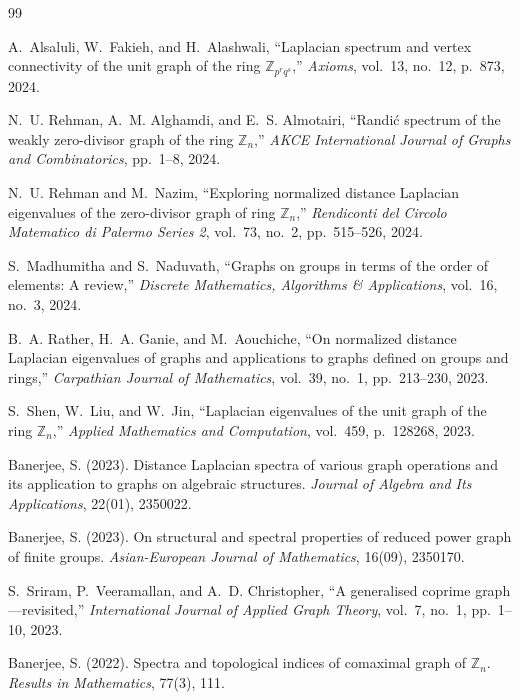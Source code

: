 \documentclass[12pt]{article}
\begin{document}
	\begin{thebibliography}{99}
		
		A.~Alsaluli, W.~Fakieh, and H.~Alashwali, ``Laplacian spectrum and vertex connectivity of the unit graph of the ring $\mathbb{Z}_{p^rq^s}$,'' \emph{Axioms}, vol.~13, no.~12, p.~873, 2024.
		
		N.~U. Rehman, A.~M. Alghamdi, and E.~S. Almotairi, ``Randić spectrum of the weakly zero-divisor graph of the ring $\mathbb{Z}_n$,'' \emph{AKCE International Journal of Graphs and Combinatorics}, pp.~1--8, 2024.
		
		N.~U. Rehman and M.~Nazim, ``Exploring normalized distance Laplacian eigenvalues of the zero-divisor graph of ring $\mathbb{Z}_n$,'' \emph{Rendiconti del Circolo Matematico di Palermo Series 2}, vol.~73, no.~2, pp.~515--526, 2024.
		
		S.~Madhumitha and S.~Naduvath, ``Graphs on groups in terms of the order of elements: A review,'' \emph{Discrete Mathematics, Algorithms \& Applications}, vol.~16, no.~3, 2024.
		
		B.~A. Rather, H.~A. Ganie, and M.~Aouchiche, ``On normalized distance Laplacian eigenvalues of graphs and applications to graphs defined on groups and rings,'' \emph{Carpathian Journal of Mathematics}, vol.~39, no.~1, pp.~213--230, 2023.
		
		S.~Shen, W.~Liu, and W.~Jin, ``Laplacian eigenvalues of the unit graph of the ring $\mathbb{Z}_n$,'' \emph{Applied Mathematics and Computation}, vol.~459, p.~128268, 2023.
		
		Banerjee, S. (2023). Distance Laplacian spectra of various graph operations and its application to graphs on algebraic structures. \emph{Journal of Algebra and Its Applications}, 22(01), 2350022.
		
		Banerjee, S. (2023). On structural and spectral properties of reduced power graph of finite groups. \emph{Asian-European Journal of Mathematics}, 16(09), 2350170.
		
		S.~Sriram, P.~Veeramallan, and A.~D. Christopher, ``A generalised coprime graph—revisited,'' \emph{International Journal of Applied Graph Theory}, vol.~7, no.~1, pp.~1--10, 2023.
		
		Banerjee, S. (2022). Spectra and topological indices of comaximal graph of $\mathbb Z_n$. \emph{Results in Mathematics}, 77(3), 111.
		

\end{thebibliography}
\end{document}

